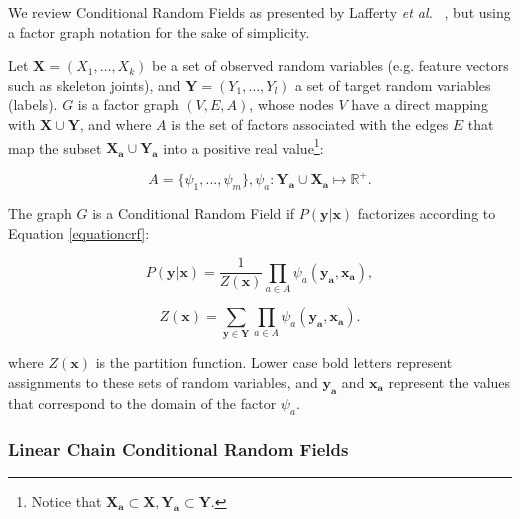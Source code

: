 \documentclass[10pt, conference]{IEEEtran}
\begin{document}

We review Conditional Random Fields as presented by Lafferty \textit{et al.} ~\cite{crf}, but using a factor graph notation for the sake of simplicity. 

Let $\mathbf{X}=(X_1,\ldots,X_k)$  be a set of observed random variables (e.g. feature vectors such as skeleton joints), and  $\mathbf{Y}=(Y_1,\ldots,Y_l)$ a set of target random variables (labels). $G$ is a factor graph $(V,E,A)$, whose nodes $V$ have a direct mapping with $\mathbf{X} \cup \mathbf{Y}$, and where $A$ is the set of factors associated with the edges $E$ that map the subset $\mathbf{X_a} \cup \mathbf{Y_a}$ into a positive real value\footnote{Notice that $\mathbf{X_a}\subset \mathbf{X},\mathbf{Y_a}\subset \mathbf{Y}$.}:

\begin{equation}
A=\{\psi_1,...,\psi_m\}, \psi_a: \mathbf{Y_a} \cup \mathbf{X_a} \mapsto \mathbb{R}^+. 
\end{equation}

The graph $G$ is a Conditional Random Field if $P(\mathbf{y}|\mathbf{x})$ factorizes according to Equation \ref{equationcrf}: 

\begin{equation}
\label{equationcrf} 
P(\mathbf{y}|\mathbf{x}) = 
\frac{1}{Z(\mathbf{x})}
\prod_{a \in A} \psi_a(\mathbf{y_a},\mathbf{x_a}),
\end{equation}

\begin{equation}
\label{normalization}
Z(\mathbf{x}) = \sum_{\mathbf{y} \in \mathbf{Y}}\prod_{a \in A} \psi_a(\mathbf{y_a},\mathbf{x_a}).
\end{equation}

\noindent where $Z(\mathbf{x})$ is the partition function. Lower case bold letters represent assignments to these sets of random variables, and $\mathbf{y_a}$ and $\mathbf{x_a}$ represent the values that correspond to the domain of the factor $\psi_a$.




\subsubsection{Linear Chain Conditional Random Fields}
\end{document}

